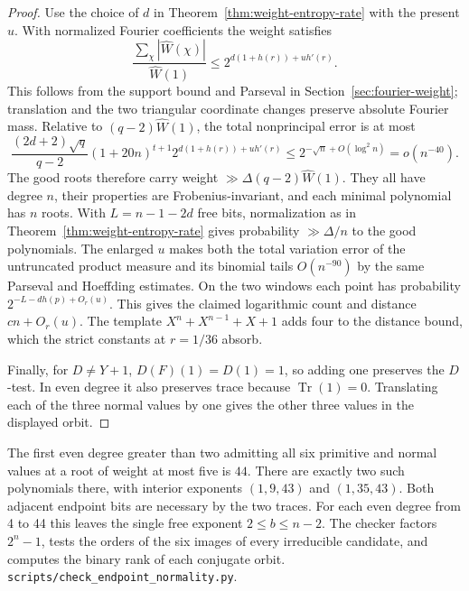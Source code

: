 \documentclass[11pt]{article}
\begin{document}
\begin{proof}
Use the choice of \(d\) in Theorem~\ref{thm:weight-entropy-rate} with
the present \(u\). With normalized Fourier coefficients the weight
satisfies
\[
 \frac{\sum_\chi|\widehat W(\chi)|}{\widehat W(1)}
 \le 2^{d(1+h(r))+u h'(r)} .
\]
This follows from the support bound and Parseval in
Section~\ref{sec:fourier-weight}; translation and the two triangular
coordinate changes preserve absolute Fourier mass. Relative to
\((q-2)\widehat W(1)\), the total nonprincipal error is at most
\[
 \frac{(2d+2)\sqrt q}{q-2}(1+20n)^{t+1}
       2^{d(1+h(r))+u h'(r)}
 \le 2^{-\sqrt n+O(\log^2 n)}=o(n^{-40}).
\]
The good roots therefore carry weight \(\gg\Delta(q-2)\widehat W(1)\).
They all have degree \(n\), their properties are Frobenius-invariant,
and each minimal polynomial has \(n\) roots. With \(L=n-1-2d\)
free bits, normalization as in Theorem~\ref{thm:weight-entropy-rate}
gives probability \(\gg \Delta/n\) to the good polynomials.
The enlarged \(u\) makes both the total variation error of the
untruncated product measure and its binomial tails \(O(n^{-90})\)
by the same Parseval and Hoeffding estimates. On the two windows
each point has probability \(2^{-L-dh(p)+O_r(u)}\).
This gives the claimed logarithmic count and distance \(cn+O_r(u)\).
The template \(X^n+X^{n-1}+X+1\) adds four to the distance bound,
which the strict constants at \(r=1/36\) absorb.

Finally, for \(D\ne Y+1\), \(D(F)(1)=D(1)=1\), so adding one
preserves the \(D\)-test. In even degree it also preserves trace
because \(\operatorname{Tr}(1)=0\). Translating each of the three
normal values by one gives the other three values in the displayed orbit.
\end{proof}

The first even degree greater than two admitting all six primitive
and normal values at a root of weight at most five is \(44\).
There are exactly two such polynomials there, with interior exponents
\((1,9,43)\) and \((1,35,43)\). Both adjacent endpoint bits are necessary
by the two traces. For each even degree from 4 to 44 this leaves the
single free exponent \(2\le b\le n-2\). The checker factors \(2^n-1\),
tests the orders of the six images of every irreducible candidate,
and computes the binary rank of each conjugate orbit.
\nolinkurl{scripts/check_endpoint_normality.py}.
\end{document}

